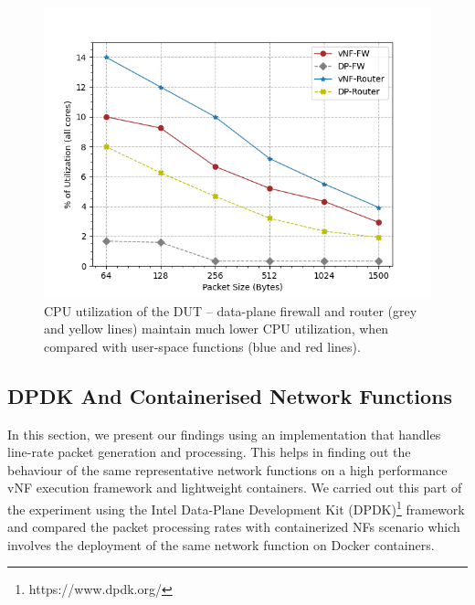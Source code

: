 \documentclass[conference]{IEEEtran}
\begin{document}
\begin{figure}[htbp]
\centering
\includegraphics[width=0.8\columnwidth]{PhysicalCPU.png}
\caption{CPU utilization of the DUT -- data-plane firewall and router (grey and yellow lines) maintain much lower CPU utilization, when compared with user-space functions (blue and red lines).}
\label{PhysicalCPU}
\end{figure}






\subsection{DPDK And Containerised Network Functions}
\label{dpdk}
In this section, we present our findings using an implementation that handles line-rate packet generation and processing. This helps in finding out the behaviour of the same representative network functions on a high performance vNF execution framework and lightweight containers. We carried out this part of the experiment using the Intel Data-Plane Development Kit (DPDK)\footnote[1]{https://www.dpdk.org/} framework and compared the packet processing rates with containerized NFs scenario which involves the deployment of the same network function on Docker containers. 
\end{document}
